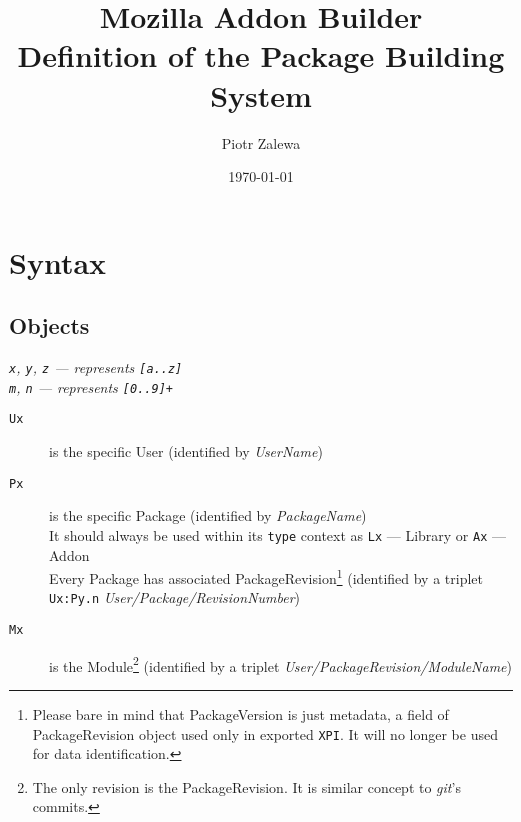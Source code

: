 \documentclass[10pt]{article}
\title{Mozilla Addon Builder\\ Definition of the Package Building System}
\author{Piotr Zalewa}
\date{\today}
\def\xpi{{\tt XPI}}
\begin{document}
\maketitle

\section{Syntax}

	\subsection{Objects}
	
	{\em \small {\tt x}, {\tt y}, {\tt z} --- represents {\tt [a..z]}\\
	{\tt m}, {\tt n} --- represents {\tt [0..9]+}}
	
	\begin{description}
		\item[{\tt Ux}] is the specific User (identified by {\em UserName})
		\item[{\tt Px}] is the specific Package (identified by {\em PackageName})\\
			It should always be used within its {\tt type} context as {\tt Lx} --- Library or {\tt Ax} --- Addon\\
			Every Package has associated PackageRevision\footnote{Please bare in mind that PackageVersion is just metadata, a field of PackageRevision object used only in exported \xpi. It will no longer be used for data identification.} (identified by a triplet {\tt Ux:Py.n} {\em User/Package/RevisionNumber})
		\item[{\tt Mx}] is the Module\footnote{The only revision is the PackageRevision. It is similar concept to {\em git}'s commits.} (identified by a triplet {\em User/PackageRevision/ModuleName})
	\end{description}
\end{document}
